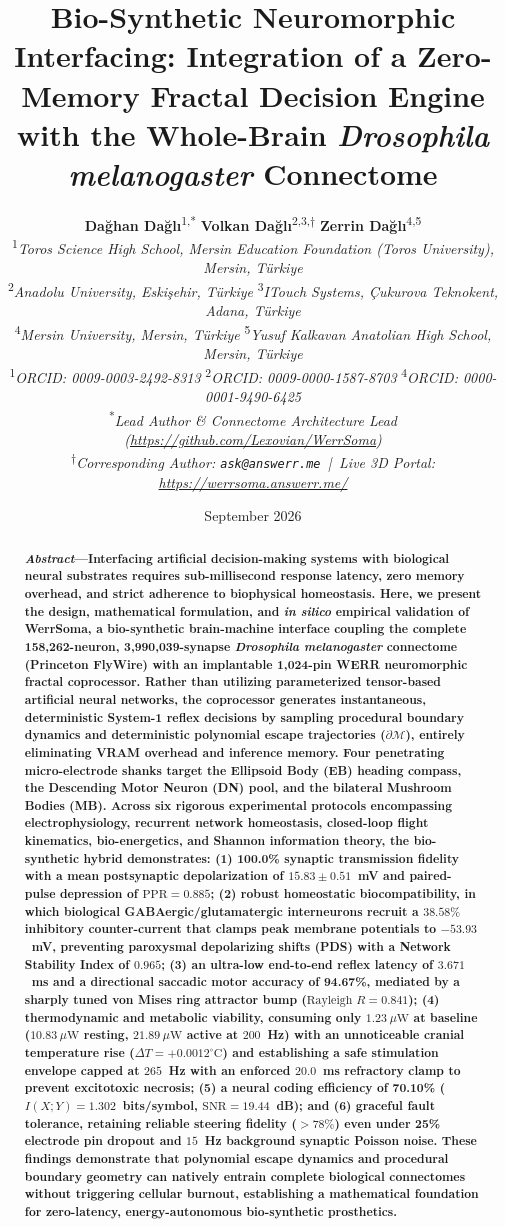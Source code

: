 \documentclass[10pt,twocolumn]{article}
\title{\textbf{\Large Bio-Synthetic Neuromorphic Interfacing: Integration of a Zero-Memory Fractal Decision Engine with the Whole-Brain \textit{Drosophila melanogaster} Connectome}}
\author{
    \textbf{Da\u{g}han Da\u{g}l\i}\textsuperscript{1,*} \quad \textbf{Volkan Da\u{g}l\i}\textsuperscript{2,3,$\dagger$} \quad \textbf{Zerrin Da\u{g}l\i}\textsuperscript{4,5} \\[0.6ex]
    \textsuperscript{1}\textit{Toros Science High School, Mersin Education Foundation (Toros University), Mersin, T\"urkiye} \\
    \textsuperscript{2}\textit{Anadolu University, Eski\c{s}ehir, T\"urkiye} \quad \textsuperscript{3}\textit{ITouch Systems, \c{C}ukurova Teknokent, Adana, T\"urkiye} \\
    \textsuperscript{4}\textit{Mersin University, Mersin, T\"urkiye} \quad \textsuperscript{5}\textit{Yusuf Kalkavan Anatolian High School, Mersin, T\"urkiye} \\[0.4ex]
    \textsuperscript{1}\textit{ORCID: 0009-0003-2492-8313} \quad \textsuperscript{2}\textit{ORCID: 0009-0000-1587-8703} \quad \textsuperscript{4}\textit{ORCID: 0000-0001-9490-6425} \\
    \textsuperscript{*}\textit{Lead Author \& Connectome Architecture Lead (\url{https://github.com/Lexovian/WerrSoma})} \\
    \textsuperscript{$\dagger$}\textit{Corresponding Author: \texttt{ask@answerr.me} \,|\, Live 3D Portal: \url{https://werrsoma.answerr.me/}}
}
\date{September 2026}
\begin{document}
\maketitle

\begin{abstract}
\textbf{\textit{Abstract}---Interfacing artificial decision-making systems with biological neural substrates requires sub-millisecond response latency, zero memory overhead, and strict adherence to biophysical homeostasis. Here, we present the design, mathematical formulation, and \textit{in silico} empirical validation of \textbf{WerrSoma}, a bio-synthetic brain-machine interface coupling the complete 158,262-neuron, 3,990,039-synapse \textit{Drosophila melanogaster} connectome (Princeton FlyWire) with an implantable 1,024-pin WERR neuromorphic fractal coprocessor. Rather than utilizing parameterized tensor-based artificial neural networks, the coprocessor generates instantaneous, deterministic System-1 reflex decisions by sampling procedural boundary dynamics and deterministic polynomial escape trajectories ($\partial \mathcal{M}$), entirely eliminating VRAM overhead and inference memory. Four penetrating micro-electrode shanks target the Ellipsoid Body (EB) heading compass, the Descending Motor Neuron (DN) pool, and the bilateral Mushroom Bodies (MB). Across six rigorous experimental protocols encompassing electrophysiology, recurrent network homeostasis, closed-loop flight kinematics, bio-energetics, and Shannon information theory, the bio-synthetic hybrid demonstrates: (1) \textbf{100.0\% synaptic transmission fidelity} with a mean postsynaptic depolarization of $15.83 \pm 0.51$~mV and paired-pulse depression of $\text{PPR} = 0.885$; (2) \textbf{robust homeostatic biocompatibility}, in which biological GABAergic/glutamatergic interneurons recruit a $38.58\%$ inhibitory counter-current that clamps peak membrane potentials to $-53.93$~mV, preventing paroxysmal depolarizing shifts (PDS) with a Network Stability Index of $0.965$; (3) \textbf{an ultra-low end-to-end reflex latency of $3.671$~ms} and a directional saccadic motor accuracy of \textbf{94.67\%}, mediated by a sharply tuned von Mises ring attractor bump ($\text{Rayleigh } R = 0.841$); (4) \textbf{thermodynamic and metabolic viability}, consuming only $1.23\ \mu\text{W}$ at baseline ($10.83\ \mu\text{W}$ resting, $21.89\ \mu\text{W}$ active at $200$~Hz) with an unnoticeable cranial temperature rise ($\Delta T = +0.0012^\circ\text{C}$) and establishing a safe stimulation envelope capped at $265$~Hz with an enforced $20.0$~ms refractory clamp to prevent excitotoxic necrosis; (5) \textbf{a neural coding efficiency of 70.10\%} ($I(X;Y) = 1.302$~bits/symbol, $\text{SNR} = 19.44$~dB); and (6) \textbf{graceful fault tolerance}, retaining reliable steering fidelity ($>78\%$) even under 25\% electrode pin dropout and $15$~Hz background synaptic Poisson noise. These findings demonstrate that polynomial escape dynamics and procedural boundary geometry can natively entrain complete biological connectomes without triggering cellular burnout, establishing a mathematical foundation for zero-latency, energy-autonomous bio-synthetic prosthetics.}


\end{abstract}
\end{document}
